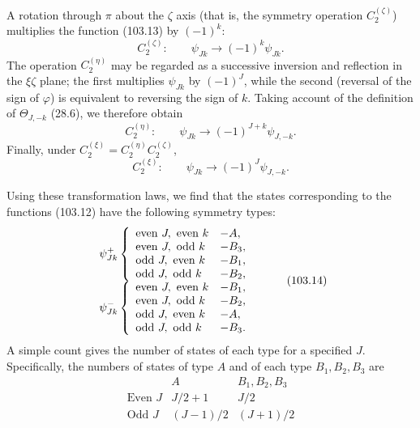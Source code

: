 A rotation through $\pi$ about the $\zeta$ axis (that is, the symmetry operation $C_2^{(\zeta)}$) multiplies the function (103.13) by $(-1)^k$:
\[
 C_2^{(\zeta)}:\qquad \psi_{Jk}\to(-1)^k\psi_{Jk}.
\]
The operation $C_2^{(\eta)}$ may be regarded as a successive inversion and reflection in the $\xi\zeta$ plane; the first multiplies $\psi_{Jk}$ by $(-1)^J$, while the second (reversal of the sign of $\varphi$) is equivalent to reversing the sign of $k$. Taking account of the definition of $\Theta_{J,-k}$ (28.6), we therefore obtain
\[
 C_2^{(\eta)}:\qquad \psi_{Jk}\to(-1)^{J+k}\psi_{J,-k}.
\]
Finally, under $C_2^{(\xi)}=C_2^{(\eta)}C_2^{(\zeta)}$,
\[
 C_2^{(\xi)}:\qquad \psi_{Jk}\to(-1)^J\psi_{J,-k}.
\]

Using these transformation laws, we find that the states corresponding to the functions (103.12) have the following symmetry types:
\begin{equation}
\begin{array}{c@{\quad}c@{\quad}c}
\psi_{Jk}^{+}\left\{\begin{array}{ll}
\text{even }J,\ \text{even }k&-A,\\
\text{even }J,\ \text{odd }k&-B_3,\\
\text{odd }J,\ \text{even }k&-B_1,\\
\text{odd }J,\ \text{odd }k&-B_2,
\end{array}\right.\\[6pt]
\psi_{Jk}^{-}\left\{\begin{array}{ll}
\text{even }J,\ \text{even }k&-B_1,\\
\text{even }J,\ \text{odd }k&-B_2,\\
\text{odd }J,\ \text{even }k&-A,\\
\text{odd }J,\ \text{odd }k&-B_3.
\end{array}\right.
\end{array} \tag{103.14}
\end{equation}
A simple count gives the number of states of each type for a specified $J$. Specifically, the numbers of states of type $A$ and of each type $B_1,B_2,B_3$ are
\begin{equation}
\begin{array}{c|c|c}
&A&B_1,B_2,B_3\\ \hline
\text{Even }J&J/2+1&J/2\\
\text{Odd }J&(J-1)/2&(J+1)/2
\end{array} \tag{103.15}
\end{equation}

